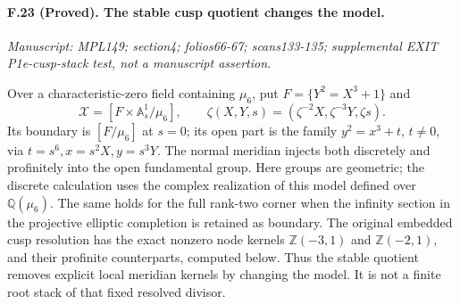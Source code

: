 \paragraph{F.23 (Proved). The stable cusp quotient changes the model.}
\textit{Manuscript: MPL149; section4; folios66-67; scans133-135; supplemental EXIT P1e-cusp-stack test, not a manuscript assertion.}

Over a characteristic-zero field containing $\mu_6$, put
$F=\{Y^2=X^3+1\}$ and
\[
 \mathcal X=[F\times\mathbb A^1_s/\mu_6],\qquad
 \zeta(X,Y,s)=(\zeta^{-2}X,\zeta^{-3}Y,\zeta s).
\]
Its boundary is $[F/\mu_6]$ at $s=0$; its open part is the family
$y^2=x^3+t$, $t\ne0$, via $t=s^6,x=s^2X,y=s^3Y$.
The normal meridian injects both discretely and profinitely into
the open fundamental group. Here groups are geometric; the discrete
calculation uses the complex realization of this model defined over
$\mathbb Q(\mu_6)$. The same holds for the full rank-two corner when
the infinity section in the projective elliptic completion is retained
as boundary. The original embedded cusp resolution has the exact
nonzero node kernels $\mathbb Z(-3,1)$ and $\mathbb Z(-2,1)$,
and their profinite counterparts, computed below. Thus the stable
quotient removes explicit local meridian kernels by changing the
model. It is not a finite root stack of that fixed resolved divisor.

